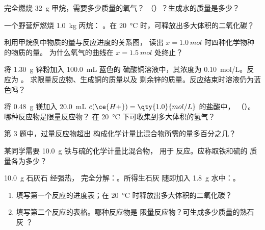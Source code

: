 \begin{exercise}[$\star\star$]\label{exo:g10:reaction-progress-table:6}
完全燃烧 \qty{32}{g} 甲烷，需要多少质量的氧气？
（）？生成水的质量是多少？
\end{exercise}

\begin{exercise}[$\star\star$]\label{exo:g10:reaction-progress-table:7}
一个野营炉燃烧 \qty{1.0}{kg} 丙烷：
。在
\qty{20}{\celsius} 时，可释放出多大体积的二氧化碳？
\end{exercise}

\begin{exercise}[$\star\star$]\label{exo:g10:reaction-progress-table:8}
利用甲烷例中物质的量与反应进度的关系图，
读出 $x = \qty{1.0}{mol}$ 时四种化学物种的物质的量。
为什么氧气的曲线在 $x = \qty{1.5}{mol}$ 处终止？
\end{exercise}

\begin{exercise}[$\star\star$]\label{exo:g10:reaction-progress-table:9}
将 \qty{1.30}{g} 锌粉加入 \qty{100.0}{mL} 蓝色的
硫酸铜溶液中，其浓度为 \qty{0.10}{mol/L}。反应为
。
求限量反应物、生成铜的质量以及
剩余锌的质量。反应结束时溶液仍为蓝色吗？
\end{exercise}

\begin{exercise}[$\star\star$]\label{exo:g10:reaction-progress-table:10}
将 \qty{0.48}{g} 镁加入 \qty{20.0}{mL}
$c(\ce{H+}) = \qty{1.0}{mol/L}$ 的盐酸中，
（）。哪种反应物是限量反应物？
在 \qty{20}{\celsius} 下可收集到多大体积的氢气？
\end{exercise}

\begin{exercise}[$\star\star$]\label{exo:g10:reaction-progress-table:11}
第 3 题中，过量反应物超出
构成化学计量比混合物所需的量多百分之几？
\end{exercise}

\begin{exercise}[$\star\star\star$]\label{exo:g10:reaction-progress-table:12}
某同学需要 \qty{10.0}{g} 铁与硫的化学计量比混合物，
用于  反应。应称取铁和硫的
质量各为多少？
\end{exercise}

\begin{exercise}[$\star\star\star$]\label{exo:g10:reaction-progress-table:13}
\qty{10.0}{g} 石灰石  经强热，
完全分解：。所得生石灰 
随即加入 \qty{1.8}{g} 水中：。
\begin{enumerate}
  \item 填写第一个反应的进度表；在
        \qty{20}{\celsius} 时释放出多大体积的二氧化碳？
  \item 填写第二个反应的表格。哪种反应物是
        限量反应物？可生成多少质量的熟石灰 ？
\end{enumerate}
\end{exercise}

